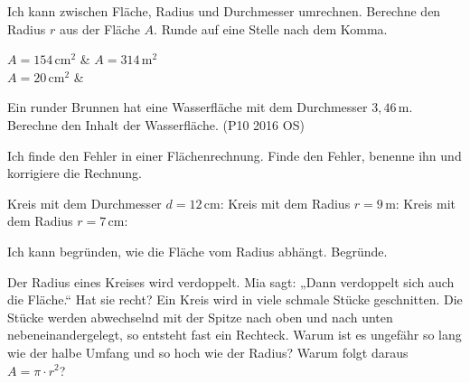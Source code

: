 \begin{aufgabe}{Ich kann zwischen Fläche, Radius und Durchmesser umrechnen.}
Berechne den Radius $r$ aus der Fläche $A$. Runde auf eine Stelle nach dem Komma.
\begin{teilezwei}
\tz $A = 154\,\text{cm}^2$ \quad {} & \tz $A = 314\,\text{m}^2$ \quad {} \\
\tz $A = 20\,\text{cm}^2$ \quad {} & \\
\end{teilezwei}
\begin{teile}
\teil Ein runder Brunnen hat eine Wasserfläche mit dem Durchmesser $3{,}46\,\text{m}$. Berechne den Inhalt der Wasserfläche. (P10 2016 OS) \hfill \leerfeld[m²]
\end{teile}
\end{aufgabe}

\begin{aufgabe}{Ich finde den Fehler in einer Flächenrechnung.}
Finde den Fehler, benenne ihn und korrigiere die Rechnung.
\begin{teile}
\teil Kreis mit dem Durchmesser $d = 12\,\text{cm}$: 
\teil Kreis mit dem Radius $r = 9\,\text{m}$: 
\teil Kreis mit dem Radius $r = 7\,\text{cm}$: 
\end{teile}
\end{aufgabe}

\begin{aufgabe}{Ich kann begründen, wie die Fläche vom Radius abhängt.}
Begründe.
\begin{teile}
\teil Der Radius eines Kreises wird verdoppelt. Mia sagt: „Dann verdoppelt sich auch die Fläche.“ Hat sie recht?
\teil Ein Kreis wird in viele schmale Stücke geschnitten. Die Stücke werden abwechselnd mit der Spitze nach oben und nach unten nebeneinandergelegt, so entsteht fast ein Rechteck. Warum ist es ungefähr so lang wie der halbe Umfang und so hoch wie der Radius? Warum folgt daraus $A = \pi \cdot r^2$?
\end{teile}
\end{aufgabe}

